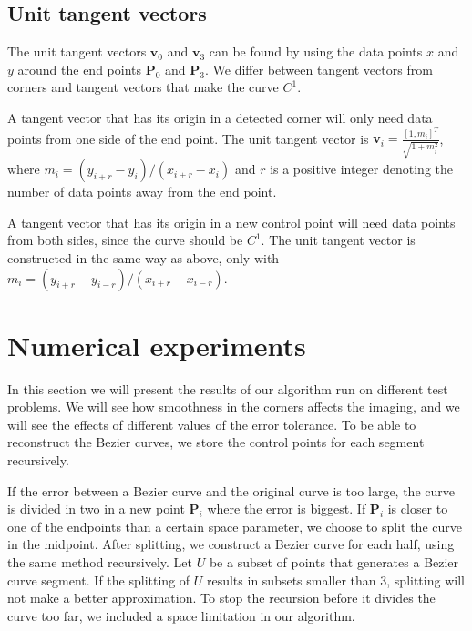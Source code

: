\documentclass[10pt]{article}
\begin{document}
\subsection*{Unit tangent vectors}
The unit tangent vectors $\mathbf{v}_0$ and $\mathbf{v}_3$ can be found by using the data points $x$ and $y$ around the end points $\mathbf{P}_0$ and $\mathbf{P}_3$. We differ between tangent vectors from corners and tangent vectors that make the curve $C^1$.

A tangent vector that has its origin in a detected corner will only need data points from one side of the end point. The unit tangent vector is  $\mathbf{v}_i = \frac{[1, m_i]^T}{\sqrt{1+m_i^2}}$, where $m_i = (y_{i+r} - y_i)/(x_{i+r} - x_i)$ and $r$ is a positive integer denoting the number of data points away from the end point.

A tangent vector that has its origin in a new control point will need data points from both sides, since the curve should be $C^1$. The unit tangent vector is constructed in the same way as above, only with $m_i = (y_{i+r} - y_{i-r})/(x_{i+r} - x_{i-r})$.


\section*{Numerical experiments}

In this section we will present the results of our algorithm run on different test problems. We will see how smoothness in the corners affects the imaging, and we will see the effects of different values of the error tolerance. To be able to reconstruct the Bezier curves, we store the control points for each segment recursively.

If the error between a Bezier curve and the original curve is too large, the curve is divided in two in a new point $\mathbf{P}_i$ where the error is biggest. If $\mathbf{P}_i$ is closer to one of the endpoints than a certain space parameter, we choose to split the curve in the midpoint. After splitting, we construct a Bezier curve for each half, using the same method recursively. Let $U$ be a subset of points that generates a Bezier curve segment. If the splitting of $U$ results in subsets smaller than 3, splitting will not make a better approximation. To stop the recursion before it divides the curve too far, we included a space limitation in our algorithm. 
\end{document}
